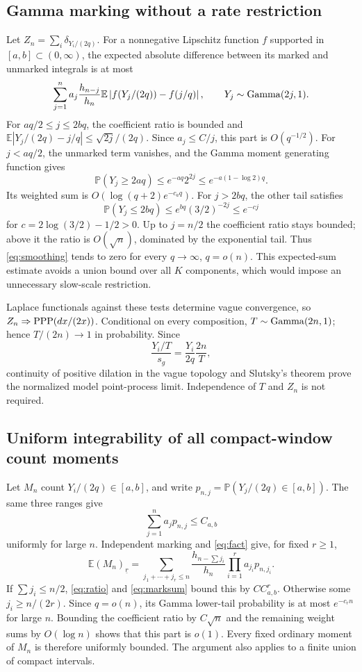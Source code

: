 \documentclass[11pt]{article}
\theoremstyle{remark}\newtheorem{remark}[theorem]{Remark}
\newcommand{\E}{\mathbb E}\newcommand{\Prob}{\mathbb P}
\newcommand{\fall}[2]{(#1)_{\underline{#2}}}
\begin{document}
\subsection*{Gamma marking without a rate restriction}
Let $Z_n=\sum_i\delta_{Y_i/(2q)}$. For a nonnegative Lipschitz function $f$ supported in $[a,b]\subset(0,\infty)$, the expected absolute difference between its marked and unmarked integrals is at most
\begin{equation}\label{eq:smoothing}
 \sum_{j=1}^n a_j\frac{h_{n-j}}{h_n}
 \E\left|f(Y_j/(2q))-f(j/q)\right|,
 \qquad Y_j\sim\Gam(2j,1).
\end{equation}
For $aq/2\le j\le2bq$, the coefficient ratio is bounded and $\E|Y_j/(2q)-j/q|\le\sqrt{2j}/(2q)$. Since $a_j\le C/j$, this part is $O(q^{-1/2})$.
For $j<aq/2$, the unmarked term vanishes, and the Gamma moment generating function gives
\[
 \Prob(Y_j\ge2aq)\le e^{-aq}2^{2j}
 \le e^{-a(1-\log2)q}.
\]
Its weighted sum is $O(\log(q+2)e^{-c_aq})$. For $j>2bq$, the other tail satisfies
\[
 \Prob(Y_j\le2bq)\le e^{bq}(3/2)^{-2j}\le e^{-c j}
\]
for $c=2\log(3/2)-1/2>0$. Up to $j=n/2$ the coefficient ratio stays bounded; above it the ratio is $O(\sqrt n)$, dominated by the exponential tail. Thus \eqref{eq:smoothing} tends to zero for every $q\to\infty$, $q=o(n)$. This expected-sum estimate avoids a union bound over all $K$ components, which would impose an unnecessary slow-scale restriction.

Laplace functionals against these tests determine vague convergence, so $Z_n\Rightarrow\operatorname{PPP}(dx/(2x))$. Conditional on every composition, $T\sim\operatorname{Gamma}(2n,1)$; hence $T/(2n)\to1$ in probability. Since
\[
 \frac{Y_i/T}{s_g}=\frac{Y_i}{2q}\frac{2n}{T},
\]
continuity of positive dilation in the vague topology and Slutsky's theorem prove the normalized model point-process limit. Independence of $T$ and $Z_n$ is not required.

\subsection*{Uniform integrability of all compact-window count moments}
Let $M_n$ count $Y_i/(2q)\in[a,b]$, and write $p_{n,j}=\Prob(Y_j/(2q)\in[a,b])$. The same three ranges give
\begin{equation}\label{eq:marksum}
 \sum_{j=1}^n a_jp_{n,j}\le C_{a,b}
\end{equation}
uniformly for large $n$. Independent marking and \eqref{eq:fact} give, for fixed $r\ge1$,
\begin{equation}\label{eq:markedmom}
 \E\fall{M_n}{r}=\sum_{j_1+\cdots+j_r\le n}
 \frac{h_{n-\sum j_i}}{h_n}\prod_{i=1}^r a_{j_i}p_{n,j_i}.
\end{equation}
If $\sum j_i\le n/2$, \eqref{eq:ratio} and \eqref{eq:marksum} bound this by $C C_{a,b}^r$. Otherwise some $j_i\ge n/(2r)$. Since $q=o(n)$, its Gamma lower-tail probability is at most $e^{-c_r n}$ for large $n$. Bounding the coefficient ratio by $C\sqrt n$ and the remaining weight sums by $O(\log n)$ shows that this part is $o(1)$. Every fixed ordinary moment of $M_n$ is therefore uniformly bounded. The argument also applies to a finite union of compact intervals.
\end{document}
